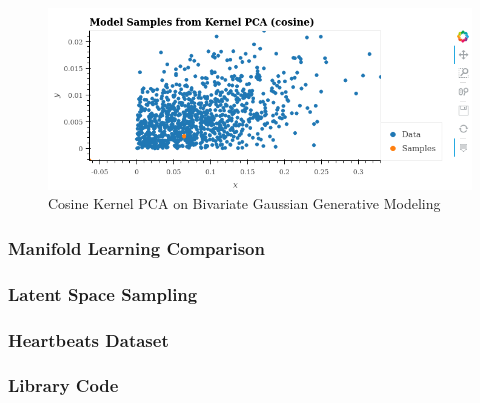 \documentclass[12pt]{article}
\begin{document}
\begin{figure}[!hb]
\includegraphics[scale = 0.3]{../../media/04-generative-kpca.png}
    \caption{Cosine Kernel PCA on Bivariate Gaussian Generative Modeling}
    \label{fig:generative-kpca}
\end{figure}
\newpage



\newpage
%
%
\subsubsection{Manifold Learning Comparison}

\subsubsection{Latent Space Sampling}

\subsubsection{Heartbeats Dataset}

\subsubsection{Library Code}






\newpage
%



\end{document}
